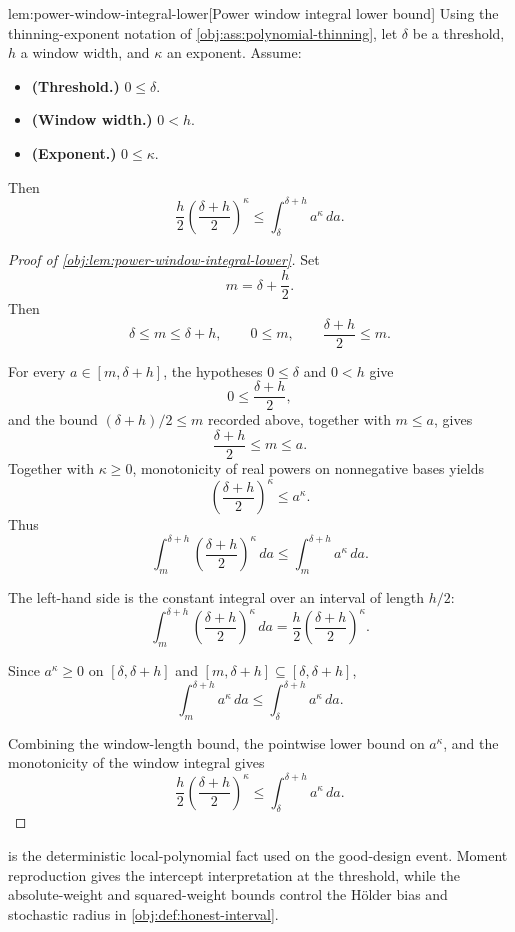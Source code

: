 \documentclass[11pt]{article}
\begin{document}
\begin{lemmav}{lem:power-window-integral-lower}[Power window integral lower bound]
Using the thinning-exponent notation of \cref{obj:ass:polynomial-thinning}, let \(\delta\) be a threshold, \(h\) a window width, and \(\kappa\) an exponent. Assume:
\begin{itemize}
\item \textbf{(Threshold.)} \(0\le \delta\).
\item \textbf{(Window width.)} \(0<h\).
\item \textbf{(Exponent.)} \(0\le \kappa\).
\end{itemize}
Then
\[
\frac{h}{2}\left(\frac{\delta+h}{2}\right)^{\kappa}
\le
\int_{\delta}^{\delta+h} a^{\kappa}\,da .
\]
\end{lemmav}

\begin{proof}[Proof of \cref{obj:lem:power-window-integral-lower}]
Set
\[
m=\delta+\frac h2 .
\]
Then
\[
\delta\le m\le \delta+h,
\qquad
0\le m,
\qquad
\frac{\delta+h}{2}\le m .
\] %

For every \(a\in[m,\delta+h]\), the hypotheses \(0\le\delta\) and \(0<h\) give
\[
0\le \frac{\delta+h}{2},
\]
and the bound \((\delta+h)/2\le m\) recorded above, together with \(m\le a\), gives
\[
\frac{\delta+h}{2}\le m\le a .
\]
Together with \(\kappa\ge0\), monotonicity of real powers on nonnegative bases yields
\[
\left(\frac{\delta+h}{2}\right)^\kappa
\le
a^\kappa .
\]
Thus
\[
\int_m^{\delta+h}
\left(\frac{\delta+h}{2}\right)^\kappa\,da
\le
\int_m^{\delta+h} a^\kappa\,da .
\] %

The left-hand side is the constant integral over an interval of length \(h/2\):
\[
\int_m^{\delta+h}
\left(\frac{\delta+h}{2}\right)^\kappa\,da
=
\frac h2\left(\frac{\delta+h}{2}\right)^\kappa .
\] %

Since \(a^\kappa\ge0\) on \([\delta,\delta+h]\) and
\([m,\delta+h]\subseteq[\delta,\delta+h]\),
\[
\int_m^{\delta+h}a^\kappa\,da
\le
\int_\delta^{\delta+h}a^\kappa\,da .
\] %

Combining the window-length bound, the pointwise lower bound on \(a^\kappa\), and the
monotonicity of the window integral gives
\[
\frac h2\left(\frac{\delta+h}{2}\right)^\kappa
\le
\int_\delta^{\delta+h}a^\kappa\,da .
\] %
\end{proof}

 is the deterministic local-polynomial fact used on the good-design event. Moment reproduction gives the intercept interpretation at the threshold, while the absolute-weight and squared-weight bounds control the Hölder bias and stochastic radius in \cref{obj:def:honest-interval}.
\end{document}
